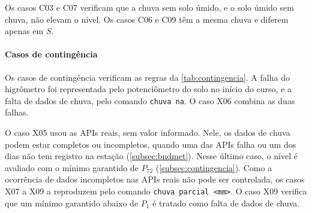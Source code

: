 Os casos C03 e C07 verificam que a chuva sem solo úmido, e o solo úmido
sem chuva, não elevam o nível. Os casos C06 e C09 têm a mesma chuva e
diferem apenas em $S$.

\paragraph*{Casos de contingência}

Os casos de contingência verificam as regras da
\autoref{tab:contingencia}. A falha do higrômetro foi representada pelo
potenciômetro do solo no início do curso, e a falta de dados de chuva,
pelo comando \texttt{chuva na}. O caso X06 combina as duas falhas.

O caso X05 usou as APIs reais, sem valor informado. Nele, os dados de
chuva podem estar completos ou incompletos, quando uma das APIs falha ou
um dos dias não tem registro na estação (\autoref{subsec:bndmet}). Nesse
último caso, o nível é avaliado com o mínimo garantido de $P_{72}$
(\autoref{subsec:contingencia}).
Como a ocorrência de dados incompletos nas APIs reais não pode ser
controlada, os casos X07 a X09 a reproduzem pelo comando
\texttt{chuva parcial <mm>}. O caso X09 verifica que um mínimo garantido
abaixo de $P_1$ é tratado como falta de dados de chuva.

